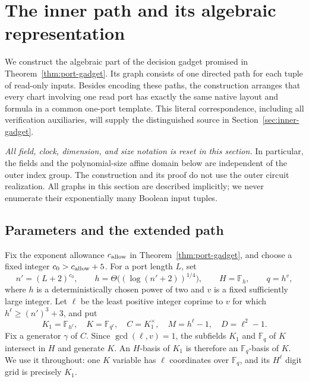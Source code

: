 \section{The inner path and its algebraic representation}\label{sec:inner-algebra}

We construct the algebraic part of the decision gadget promised in
Theorem~\ref{thm:port-gadget}.  Its graph consists of one directed path for
each tuple of read-only inputs.  Besides encoding these paths, the
construction arranges that every chart involving one read port has exactly
the same native layout and formula in a common one-port template.  This
literal correspondence, including all verification auxiliaries, will supply
the distinguished source in Section~\ref{sec:inner-gadget}.

\emph{All field, clock, dimension, and size notation is reset in this
section.}  In particular, the fields and the polynomial-size affine domain
below are independent of the outer index group.  The construction and its
proof do not use the outer circuit realization.  All graphs in this section
are described implicitly; we never enumerate their exponentially many
Boolean input tuples.

\subsection{Parameters and the extended path}\label{ia:path-parameters}

Fix the exponent allowance $c_{\rm allow}$ in
Theorem~\ref{thm:port-gadget}, and choose a fixed integer
$c_0>c_{\rm allow}+5$.  For a port length $L$, set
\begin{equation}
 n'=(L+2)^{c_0},\qquad
 h=\Theta\bigl((\log(n'+2))^{1/4}\bigr),\qquad
 H=\mathbb F_h,\qquad q=h^v,                         \label{ia:parameters}
\end{equation}
where $h$ is a deterministically chosen power of two and $v$ is a fixed
sufficiently large integer.  Let $\ell$ be the least positive integer
coprime to $v$ for which $h^\ell\ge(n')^3+3$, and put
\begin{equation}
 K_1=\mathbb F_{h^\ell},\quad K=\mathbb F_{q^\ell},\quad
 C=K_1^\times,\quad M=h^\ell-1,\quad D=\ell^2-1.
                                                               \label{ia:fields}
\end{equation}
Fix a generator $\gamma$ of $C$.  Since $\gcd(\ell,v)=1$, the subfields
$K_1$ and $\mathbb F_q$ of $K$ intersect in $H$ and generate $K$.
An $H$-basis of $K_1$ is therefore an $\mathbb F_q$-basis of $K$.
We use it throughout: one $K$ variable has $\ell$ coordinates over
$\mathbb F_q$, and its $H^\ell$ digit grid is precisely $K_1$.

